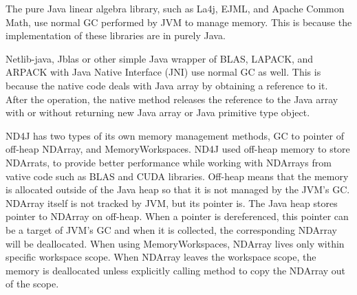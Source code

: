 The pure Java linear algebra library, such as La4j, EJML, and Apache Common Math, 
use normal GC performed by JVM to manage memory. This is because the implementation of these libraries are in purely Java.

Netlib-java, Jblas or other simple Java wrapper of BLAS, LAPACK, and ARPACK with Java Native Interface (JNI) use normal GC as well. 
This is because the native code deals with Java array by obtaining a reference to it. After the operation, 
the native method releases the reference to the Java array with or without returning new Java array or Java primitive type object. 

ND4J has two types of  its own memory management methods, GC to pointer of off-heap NDArray, and MemoryWorkspaces. 
ND4J used off-heap memory to store NDArrats, to provide better performance while working with NDArrays from vative code such as BLAS and CUDA libraries. 
Off-heap means that the memory is allocated outside of the Java heap so that it is not managed by the JVM’s GC. NDArray itself is not tracked by JVM, 
but its pointer is. The Java heap stores pointer to NDArray on off-heap. When a pointer is dereferenced, this pointer can be a target of JVM’s GC and when it is collected, 
the corresponding NDArray will be deallocated. When using MemoryWorkspaces, NDArray lives only within specific workspace scope. 
When NDArray leaves the workspace scope, the memory is deallocated unless explicitly calling method to copy the NDArray out of the scope.
